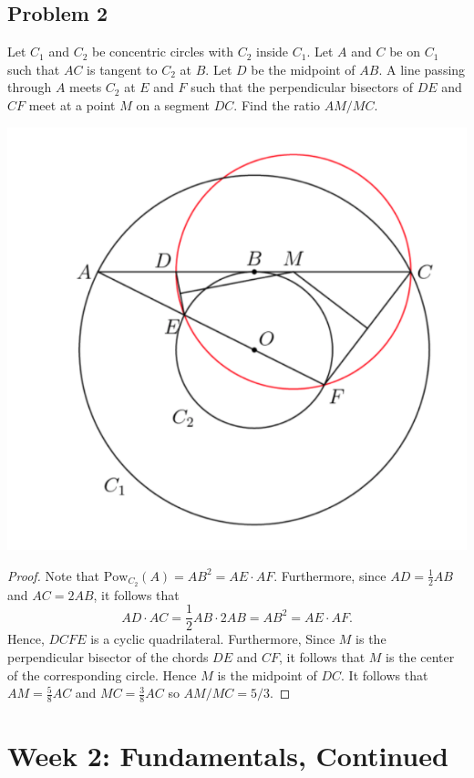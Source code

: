 \documentclass[12pt]{scrartcl}
\newcommand{\<}{\langle}
\renewcommand{\>}{\rangle}
\begin{document}
\subsection{Problem 2}
\begin{Prob} Let $C_1$ and $C_2$ be concentric circles with $C_2$ inside $C_1$.  Let $A$ and $C$ be on $C_1$ such that $AC$ is tangent to $C_2$ at $B$.  Let $D$ be the midpoint of $AB$.  A line passing through $A$ meets $C_2$ at $E$ and $F$ such that the perpendicular bisectors of $DE$ and $CF$ meet at a point $M$ on a segment $DC$.  Find the ratio $AM/MC$.
\end{Prob}
\begin{center}
\includegraphics[scale=0.4]{graphics/hw1-2.png}
\end{center}
\begin{proof}
Note that $\text{Pow}_{C_2}(A) = AB^2 = AE \cdot AF$.  Furthermore, since $AD = \frac{1}{2}AB$ and $AC = 2AB$, it follows that 
$$AD \cdot AC = \frac{1}{2}AB \cdot 2AB = AB^2 = AE \cdot AF.$$
Hence, $DCFE$ is a cyclic quadrilateral.  Furthermore,  Since $M$ is the perpendicular bisector of the chords $DE$ and $CF$, it follows that $M$ is the center of the corresponding circle.  Hence $M$ is the midpoint of $DC$.  It follows that $AM = \frac{5}{8}AC$ and $MC = \frac{3}{8}AC$ so $AM/MC = 5/3$.
\end{proof}
\pagebreak
\section{Week 2: Fundamentals, Continued}
\end{document}
